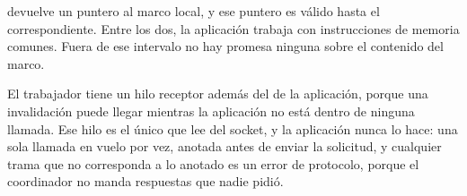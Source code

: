  devuelve un puntero al marco local, y ese puntero es válido
hasta el  correspondiente. Entre los dos, la aplicación
trabaja con instrucciones de memoria comunes. Fuera de ese intervalo no hay
promesa ninguna sobre el contenido del marco.

El trabajador tiene un hilo receptor además del de la aplicación, porque una
invalidación puede llegar mientras la aplicación no está dentro de ninguna
llamada. Ese hilo es el único que lee del socket, y la aplicación nunca lo
hace: una sola llamada en vuelo por vez, anotada antes de enviar la solicitud,
y cualquier trama que no corresponda a lo anotado es un error de protocolo,
porque el coordinador no manda respuestas que nadie pidió.
